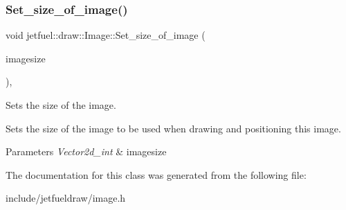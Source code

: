 \subsubsection{\texorpdfstring{Set\+\_\+size\+\_\+of\+\_\+image()}{Set\_size\_of\_image()}}
{\footnotesize\ttfamily void jetfuel\+::draw\+::\+Image\+::\+Set\+\_\+size\+\_\+of\+\_\+image (\begin{DoxyParamCaption}\item[{const \hyperlink{classjetfuel_1_1draw_1_1Vector2d}{Vector2d\+\_\+int}}]{imagesize }\end{DoxyParamCaption})\hspace{0.3cm}{\ttfamily [inline]}, {\ttfamily [protected]}}



Sets the size of the image. 

Sets the size of the image to be used when drawing and positioning this image.


\begin{DoxyParams}{Parameters}
{\em Vector2d\+\_\+int} & imagesize \\
\hline
\end{DoxyParams}


The documentation for this class was generated from the following file\+:\begin{DoxyCompactItemize}
\item 
include/jetfueldraw/image.\+h\end{DoxyCompactItemize}
